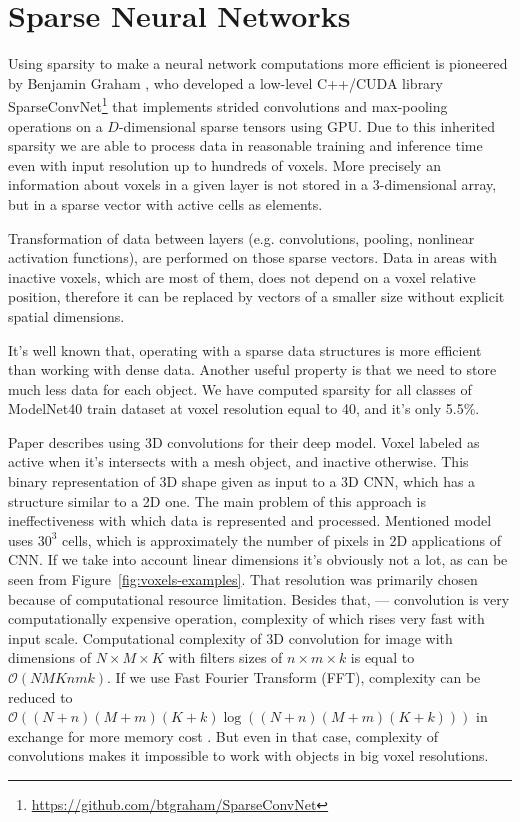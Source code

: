 \section{Sparse Neural Networks}
\label{sec:3}
Using sparsity to make a neural network computations more efficient is pioneered by Benjamin Graham \cite{graham2014spatially}, who developed a low-level C++/CUDA library SparseConvNet\footnote{\url{https://github.com/btgraham/SparseConvNet}} that implements strided convolutions and max-pooling operations on a $D$-dimensional sparse tensors using GPU. Due to this inherited sparsity we are able to process data in reasonable training and inference time even with input resolution up to hundreds of voxels.
More precisely an information about voxels in a given layer is not stored in a 3-dimensional array, but in a sparse vector with active cells as elements.

Transformation of data between layers (e.g. convolutions, pooling, nonlinear activation functions), are performed on those sparse vectors. Data in areas with inactive voxels, which are most of them, does not depend on a voxel relative position, therefore it can be replaced by vectors of a smaller size without explicit spatial dimensions.

It's well known that, operating with a sparse data structures is more efficient than working with dense data.
Another useful property is that we need to store much less data for each object.
We have computed sparsity for all classes of ModelNet40 train dataset at voxel resolution equal to 40, and it's only 5.5\%.

Paper \cite{wu20153d} describes using 3D convolutions for their deep model.
Voxel labeled as active when it's intersects with a mesh object, and inactive otherwise.
This binary representation of 3D shape given as input to a 3D CNN, which has a structure similar to a 2D one.
The main problem of this approach is ineffectiveness with which data is represented and processed.
Mentioned model uses $30^3$ cells, which is approximately the number of pixels in 2D applications of CNN.
If we take into account linear dimensions it's obviously not a lot, as can be seen from Figure~\ref{fig:voxels-examples}.
That resolution was primarily chosen because of computational resource limitation.
Besides that, --- convolution is very computationally expensive operation, complexity of which rises very fast with input scale.
Computational complexity of 3D convolution for image with dimensions of $N \times M \times K$ with filters sizes of $n \times m \times k$ is equal to $\mathcal{O}(NMKnmk)$.
If we use Fast Fourier Transform (FFT), complexity can be reduced to  $\mathcal{O}((N + n)(M + m)(K + k)\log((N + n)(M + m)(K + k)))$
in exchange for more memory cost \cite{mathieu2013fast}.
But even in that case, complexity of convolutions makes it impossible to work with objects in big voxel resolutions.

